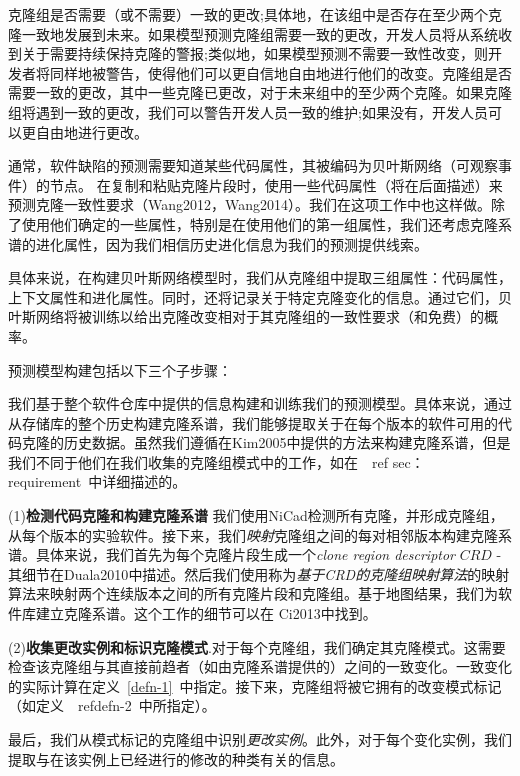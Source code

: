 克隆组是否需要（或不需要）一致的更改;具体地，在该组中是否存在至少两个克隆一致地发展到未来。如果模型预测克隆组需要一致的更改，开发人员将从系统收到关于需要持续保持克隆的警报;类似地，如果模型预测不需要一致性改变，则开发者将同样地被警告，使得他们可以更自信地自由地进行他们的改变。{克隆组是否需要一致的更改，其中一些克隆已更改，对于未来组中的至少两个克隆。如果克隆组将遇到一致的更改，我们可以警告开发人员一致的维护;如果没有，开发人员可以更自由地进行更改。}

通常，软件缺陷的预测需要知道某些代码属性，其被编码为贝叶斯网络（可观察事件）的节点。
在复制和粘贴克隆片段时，使用一些代码属性（将在后面描述）来预测克隆一致性要求（Wang2012，Wang2014）。我们在这项工作中也这样做。除了使用他们确定的一些属性，特别是在使用他们的第一组属性，我们还考虑克隆系谱的进化属性，因为我们相信历史进化信息为我们的预测提供线索。

具体来说，在构建贝叶斯网络模型时，我们从克隆组中提取三组属性：代码属性，上下文属性和进化属性。同时，还将记录关于特定克隆变化的信息。通过它们，贝叶斯网络将被训练以给出克隆改变相对于其克隆组的一致性要求（和免费）的概率。

预测模型构建包括以下三个子步骤：

我们基于整个软件仓库中提供的信息构建和训练我们的预测模型。具体来说，通过从存储库的整个历史构建克隆系谱，我们能够提取关于在每个版本的软件可用的代码克隆的历史数据。虽然我们遵循在\cite {}{Kim2005}中提供的方法来构建克隆系谱，但是我们不同于他们在我们收集的克隆组模式中的工作，如在~\ ref {sec：requirement}~中详细描述的。

(1){\bf 检测代码克隆和构建克隆系谱} 我们使用NiCad检测所有克隆，并形成克隆组，从每个版本的实验软件。接下来，我们{\em 映射}克隆组之间的每对相邻版本构建克隆系谱。具体来说，我们首先为每个克隆片段生成一个{\em clone region descriptor} $ \mathit {CRD} $ - 其细节在\cite {}{Duala2010}中描述。然后我们使用称为{\em 基于CRD的克隆组映射算法}的映射算法来映射两个连续版本之间的所有克隆片段和克隆组。基于地图结果，我们为软件库建立克隆系谱。这个工作的细节可以在\cite{} {Ci2013}中找到。

(2){\bf 收集更改实例和标识克隆模式}.对于每个克隆组，我们确定其克隆模式。这需要检查该克隆组与其直接前趋者（如由克隆系谱提供的）之间的一致变化。一致变化的实际计算在定义~\ref {defn-1}~中指定。接下来，克隆组将被它拥有的改变模式标记（如定义~\ ref{defn-2}~中所指定）。

最后，我们从模式标记的克隆组中识别{\em 更改实例}。此外，对于每个变化实例，我们提取与在该实例上已经进行的修改的种类有关的信息。

